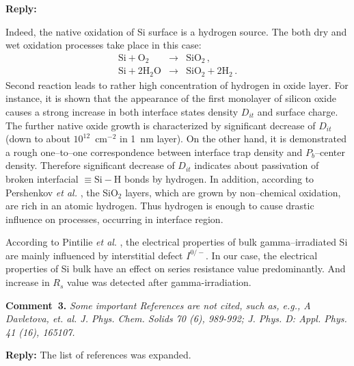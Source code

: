 \documentclass[aip,jap,preprint]{revtex4-1}
\begin{document}
\noindent
\textcolor[rgb]{0.51,0.00,0.00}{\textbf{Reply:}}

Indeed, the native oxidation of Si surface is a hydrogen source.
The both dry and wet oxidation processes take place in this case:
\begin{eqnarray}
\text{Si} + \text{O}_2&\rightarrow&\text{SiO}_2\,, \nonumber \\
\text{Si} + 2\text{H}_2\text{O}&\rightarrow&\text{SiO}_2+2\text{H}_2\,.\nonumber
\end{eqnarray}
Second reaction leads to rather high concentration of hydrogen in oxide layer.
For instance, it is shown \cite{angermann2016} that the appearance of the first monolayer of
silicon oxide causes a strong increase in both interface states density $D_{it}$ and surface charge.
The further native oxide growth is characterized by significant decrease of $D_{it}$ (down to about $10^{12}$~cm$^{-2}$ in 1~nm layer).
On the other hand, it is demonstrated \cite{Fleetwood} a rough one--to--one correspondence between interface trap density and $P_b$--center density.
Therefore significant decrease of $D_{it}$ indicates about passivation of broken interfacial $\equiv\!\mathrm{Si}\!-\!\mathrm{H}$ bonds by hydrogen.
In addition, according to Pershenkov \emph{et al.} \cite{PersenkovBook},  the SiO$_2$ layers, which are grown by non--chemical oxidation, are rich in an atomic hydrogen.
Thus hydrogen is enough to cause drastic influence on processes, occurring in interface region.

According to Pintilie \emph{et al}. \cite{FZSi:Rad}, the electrical properties of bulk gamma--irradiated Si are mainly influenced by interstitial defect $I^{0/-}$.
In our case, the electrical properties of Si bulk have an effect on series resistance value predominantly.
And increase in $R_s$ value was detected after gamma-irradiation.






\noindent
\textcolor[rgb]{0.00,0.50,1.00}{\textbf{Comment~3.}}
\emph{ Some important References are not cited, such as, e.g., A Davletova, et. al. J. Phys. Chem. Solids 70 (6), 989-992; J. Phys. D: Appl. Phys. 41 (16), 165107.}

\noindent
\textcolor[rgb]{0.51,0.00,0.00}{\textbf{Reply:}}
The list of references was expanded.



\end{document}
